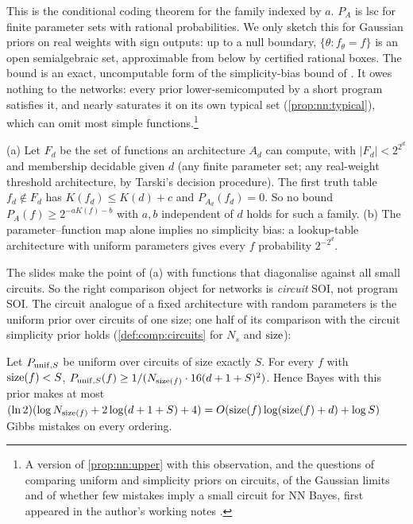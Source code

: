 This is the conditional coding theorem for the family indexed by $a$. $P_A$ is lsc for finite parameter sets with rational probabilities. We only sketch this for Gaussian priors on real weights with sign outputs: up to a null boundary, $\{\theta:f_\theta=f\}$ is an open semialgebraic set, approximable from below by certified rational boxes. The bound is an exact, uncomputable form of the simplicity-bias bound of \citet{dingle2018input}. It owes nothing to the networks: every prior lower-semicomputed by a short program satisfies it, and nearly saturates it on its own typical set (\cref{prop:nn:typical}), which can omit most simple functions.\footnote{A version of \cref{prop:nn:upper} with this observation, and the questions of comparing uniform and simplicity priors on circuits, of the Gaussian limits and of whether few mistakes imply a small circuit for NN Bayes, first appeared in the author's working notes \citep{hanni2026notes}.}

\begin{proposition}\label{prop:nn:nolower}
(a) Let $F_d$ be the set of functions an architecture $A_d$ can compute, with $|F_d|<2^{2^d}$ and membership decidable given $d$ (any finite parameter set; any real-weight threshold architecture, by Tarski's decision procedure). The first truth table $f_d\notin F_d$ has $K(f_d)\le K(d)+c$ and $P_{A_d}(f_d)=0$. So no bound $P_A(f)\ge2^{-aK(f)-b}$ with $a,b$ independent of $d$ holds for such a family. (b) The parameter--function map alone implies no simplicity bias: a lookup-table architecture with uniform parameters gives every $f$ probability $2^{-2^d}$.
\end{proposition}

The slides make the point of (a) with functions that diagonalise against all small circuits. So the right comparison object for networks is \emph{circuit} SOI, not program SOI. The circuit analogue of a fixed architecture with random parameters is the uniform prior over circuits of one size; one half of its comparison with the circuit simplicity prior holds (\cref{def:comp:circuits} for $N_s$ and $\operatorname{size}$):

\begin{proposition}\label{prop:nn:uniform}
Let $P_{{\rm unif},S}$ be uniform over circuits of size exactly $S$. For every $f$ with $\operatorname{size}(f)<S$, $P_{{\rm unif},S}(f)\ge1/(N_{\operatorname{size}(f)}\cdot16(d+1+S)^2)$. Hence Bayes with this prior makes at most $(\ln2)(\log N_{\operatorname{size}(f)}+2\log(d+1+S)+4)=O(\operatorname{size}(f)\log(\operatorname{size}(f)+d)+\log S)$ Gibbs mistakes on every ordering.
\end{proposition}

